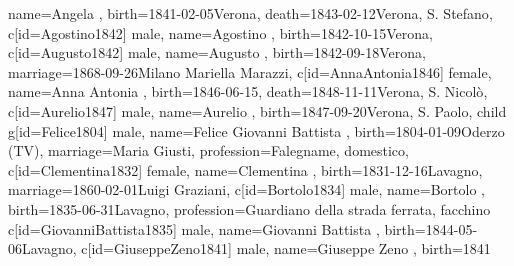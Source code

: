 \documentclass{article}
\begin{document}
\begin{center}
\begin{genealogypicture}
{{{{                    name={Angela },
                    birth={1841-02-05}{Verona},
                    death={1843-02-12}{Verona, S. Stefano},
                }
                c[id=Agostino1842]{
                    male,
                    name={Agostino },
                    birth={1842-10-15}{Verona},
                }
                c[id=Augusto1842]{
                    male,
                    name={Augusto },
                    birth={1842-09-18}{Verona},
                    marriage={1868-09-26}{Milano \newline Mariella Marazzi},
                }
                c[id=AnnaAntonia1846]{
                    female,
                    name={Anna Antonia },
                    birth={1846-06-15}{},
                    death={1848-11-11}{Verona, S. Nicolò},
                }
                c[id=Aurelio1847]{
                    male,
                    name={Aurelio },
                    birth={1847-09-20}{Verona, S. Paolo},
                }
            }
            child{
                g[id=Felice1804]{
                    male,
                    name={Felice Giovanni Battista },
                    birth={1804-01-09}{Oderzo (TV)},
                    marriage={Maria Giusti}{},
                    profession={Falegname, domestico},
                }
                c[id=Clementina1832]{
                    female,
                    name={Clementina },
                    birth={1831-12-16}{Lavagno},
                    marriage={1860-02-01}{Luigi Graziani},
                }
                c[id=Bortolo1834]{
                    male,
                    name={Bortolo },
                    birth={1835-06-31}{Lavagno},
                    profession={Guardiano della strada ferrata, facchino}
                }
                c[id=GiovanniBattista1835]{
                    male,
                    name={Giovanni Battista },
                    birth={1844-05-06}{Lavagno},
                }
                c[id=GiuseppeZeno1841]{
                    male,
                    name={Giuseppe Zeno },
                    birth={1841}{}
                }
            }
        }
    }
    \end{genealogypicture}
\end{center}

\newpage
\end{document}
